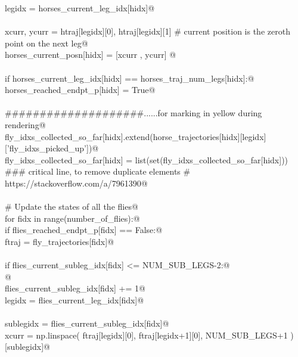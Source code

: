 \documentclass[12.0pt]{report}
\begin{document}
\begin{appendices}
\begin{flushleft}
\begin{list}{}{}
\mbox{}\verb@                    legidx    = horses_current_leg_idx[hidx]@\\
\mbox{}\verb@@\\
\mbox{}\verb@                    xcurr, ycurr = htraj[legidx][0], htraj[legidx][1] # current position is the zeroth point on the next leg@\\
\mbox{}\verb@                    horses_current_posn[hidx]  = [xcurr , ycurr] @\\
\mbox{}\verb@@\\
\mbox{}\verb@                    if horses_current_leg_idx[hidx] == horses_traj_num_legs[hidx]:@\\
\mbox{}\verb@                        horses_reached_endpt_p[hidx] = True@\\
\mbox{}\verb@@\\
\mbox{}\verb@                ####################......for marking in yellow during rendering@\\
\mbox{}\verb@                fly_idxs_collected_so_far[hidx].extend(horse_trajectories[hidx][legidx]['fly_idxs_picked_up'])@\\
\mbox{}\verb@                fly_idxs_collected_so_far[hidx] = list(set(fly_idxs_collected_so_far[hidx])) ### critical line, to remove duplicate elements # https://stackoverflow.com/a/7961390@\\
\mbox{}\verb@@\\
\mbox{}\verb@        # Update the states of all the flies@\\
\mbox{}\verb@        for fidx in range(number_of_flies):@\\
\mbox{}\verb@            if flies_reached_endpt_p[fidx] == False:@\\
\mbox{}\verb@                ftraj  = fly_trajectories[fidx]@\\
\mbox{}\verb@@\\
\mbox{}\verb@                if flies_current_subleg_idx[fidx] <= NUM_SUB_LEGS-2:@\\
\mbox{}\verb@                    @\\
\mbox{}\verb@                    flies_current_subleg_idx[fidx] += 1@\\
\mbox{}\verb@                    legidx    = flies_current_leg_idx[fidx]@\\
\mbox{}\verb@@\\
\mbox{}\verb@                    sublegidx = flies_current_subleg_idx[fidx]@\\
\mbox{}\verb@                    xcurr = np.linspace( ftraj[legidx][0], ftraj[legidx+1][0], NUM_SUB_LEGS+1 )[sublegidx]@\\

\end{list}
\end{flushleft}
\end{appendices}
\end{document}
